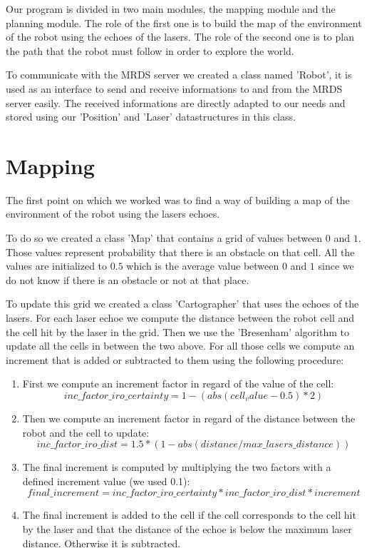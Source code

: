 Our program is divided in two main modules, the mapping module and the planning module.
The role of the first one is to build the map of the environment of the robot using the echoes of the lasers.
The role of the second one is to plan the path that the robot must follow in order to explore the world.

To communicate with the MRDS server we created a class named 'Robot', it is used as an interface to send and receive informations to and from the MRDS server easily.
The received informations are directly adapted to our needs and stored using our 'Position' and 'Laser' datastructures in this class.

\section{Mapping}

The first point on which we worked was to find a way of building a map of the environment of the robot using the lasers echoes.

To do so we created a class 'Map' that contains a grid of values between $0$ and $1$.
Those values represent probability that there is an obstacle on that cell.
All the values are initialized to $0.5$ which is the average value between $0$ and $1$ since we do not know if there is an obstacle or not at that place.

To update this grid we created a class 'Cartographer' that uses the echoes of the lasers.
For each laser echoe we compute the distance between the robot cell and the cell hit by the laser in the grid.
Then we use the 'Bresenham' algorithm to update all the cells in between the two above.
For all those cells we compute an increment that is added or subtracted to them using the following procedure:

\begin{enumerate}
    \item First we compute an increment factor in regard of the value of the cell:
        $$
        inc\_factor\_iro\_certainty = 1 - (abs(cell_value - 0.5) * 2)
        $$
    \item Then we compute an increment factor in regard of the distance between the robot and the cell to update:
        $$
        inc\_factor\_iro\_dist = 1.5 * (1 - abs(distance / max\_lasers\_distance))
        $$
    \item The final increment is computed by multiplying the two factors with a defined increment value (we used 0.1):
        $$
        final\_increment = inc\_factor\_iro\_certainty * inc\_factor\_iro\_dist * increment
        $$
    \item The final increment is added to the cell if the cell corresponds to the cell hit by the laser and that the distance of the echoe is below the maximum laser distance.
        Otherwise it is subtracted.
\end{enumerate}

